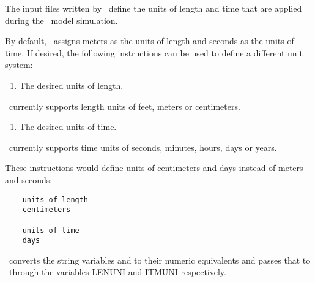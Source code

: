 \label{section:Units}
The input files written by \mut\ define the units of length and time that are applied during the \mfus\ model simulation.

By default, \mut\ assigns meters as the units of length and seconds as the units of time. If desired, the following instructions can be used to define a different unit system:

    {
        \squish
        \begin{enumerate}
        \item {}  The desired units of length.
        \end{enumerate}
        \mfus\ currently supports length units of feet, meters or centimeters.
        }

    {
        \squish
        \begin{enumerate}
        \item {}  The desired units of time.
        \end{enumerate}
        \mfus\ currently supports time units of seconds, minutes, hours, days or years.
    }

These instructions would define units of centimeters and days instead of meters and seconds:
 \begin{verbatim}
    units of length
    centimeters

    units of time
    days
 \end{verbatim}

\mut\ converts the string variables  and  to their numeric equivalents and passes that to \mfus\ through the variables \textsf{LENUNI} and \textsf{ITMUNI} respectively.
